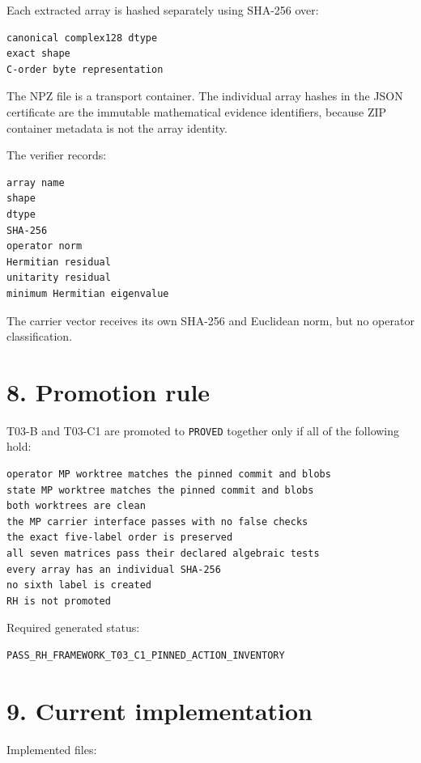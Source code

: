Each extracted array is hashed separately using SHA-256 over:

\begin{verbatim}
canonical complex128 dtype
exact shape
C-order byte representation
\end{verbatim}

The NPZ file is a transport container. The individual array hashes in the JSON
certificate are the immutable mathematical evidence identifiers, because ZIP
container metadata is not the array identity.

The verifier records:

\begin{verbatim}
array name
shape
dtype
SHA-256
operator norm
Hermitian residual
unitarity residual
minimum Hermitian eigenvalue
\end{verbatim}

The carrier vector receives its own SHA-256 and Euclidean norm, but no operator
classification.

\hypertarget{promotion-rule}{%
\section{8. Promotion rule}\label{promotion-rule}}

T03-B and T03-C1 are promoted to \texttt{PROVED} together only if all of the following
hold:

\begin{verbatim}
operator MP worktree matches the pinned commit and blobs
state MP worktree matches the pinned commit and blobs
both worktrees are clean
the MP carrier interface passes with no false checks
the exact five-label order is preserved
all seven matrices pass their declared algebraic tests
every array has an individual SHA-256
no sixth label is created
RH is not promoted
\end{verbatim}

Required generated status:

\begin{verbatim}
PASS_RH_FRAMEWORK_T03_C1_PINNED_ACTION_INVENTORY
\end{verbatim}

\hypertarget{current-implementation}{%
\section{9. Current implementation}\label{current-implementation}}

Implemented files:

